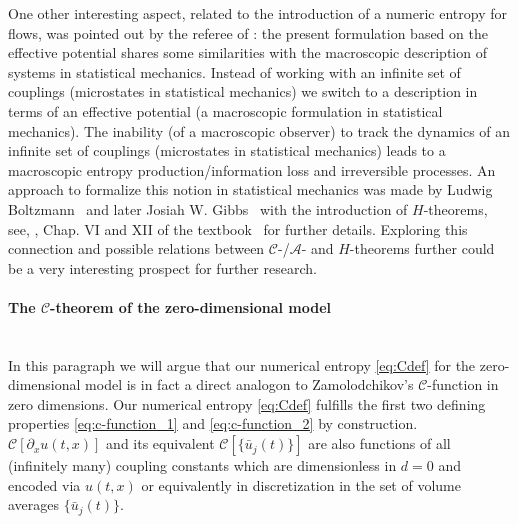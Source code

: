 One other interesting aspect, related to the introduction of a numeric entropy for \frg{} flows, was pointed out by the referee of : the present formulation based on the effective potential shares some similarities with the macroscopic description of systems in statistical mechanics.
Instead of working with an infinite set of couplings (microstates in statistical mechanics) we switch to a description in terms of an effective potential (a macroscopic formulation in statistical mechanics).
The inability (of a macroscopic observer) to track the dynamics of an infinite set of couplings (microstates in statistical mechanics) leads to a macroscopic entropy production/information loss and irreversible processes.
An approach to formalize this notion in statistical mechanics was made by Ludwig Boltzmann~\cite{Boltzmann2003} and later Josiah W. Gibbs~\cite{Gibbs2010Sep} with the introduction of $H$-theorems, see, \eg{}, Chap. VI and XII of the textbook~\cite{Tolman1979Nov} for further details. Exploring this connection and possible relations between  $\mathcal{C}$-/$\mathcal{A}$- and $H$-theorems further could be a very interesting prospect for further research.

\paragraph{The \texorpdfstring{$\mathcal{C}$}{C}-theorem of the zero-dimensional \texorpdfstring{}{O(1)} model}\label{paragraph:cTheoremzerodO1}\mbox{}\\%
In this paragraph we will argue that our numerical entropy \eqref{eq:Cdef} for the zero-dimensional  model is in fact a direct analogon to Zamolodchikov's $\mathcal{C}$-function in zero dimensions.
Our numerical entropy \eqref{eq:Cdef} fulfills the first two defining properties \eqref{eq:c-function_1} and \eqref{eq:c-function_2} by construction.
$\mathcal{C} [ \partial_x u ( t, x ) ]$ and its \fv{} equivalent $\mathcal{C} [ \{\bar{u}_j(t)\}]$ are also functions of all (infinitely many) coupling constants which are dimensionless in ${d=0}$ and encoded via $u ( t, x )$ or equivalently in \fv{} discretization in the set of volume averages $\{\bar{u}_j(t)\}$.

